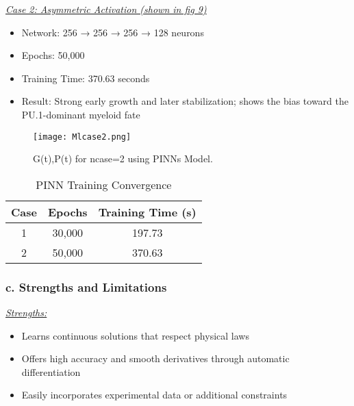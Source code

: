\documentclass[journal]{IEEEtran}
\begin{document}
\underline{\textit{Case 2: Asymmetric Activation (shown in fig 9)}}
\begin{itemize}
    \item Network: 256 → 256 → 256 → 128 neurons
    \item Epochs: 50,000
    \item Training Time: 370.63 seconds
    \item Result: Strong early growth and later stabilization; shows the bias toward the PU.1-dominant myeloid fate
\end{itemize}

\begin{figure}[H]%
\begin {center}
\texttt{[image: Mlcase2.png]}
\caption{  G(t),P(t) for  ncase=2 using PINNs Model. }
\label{fig:ecg}
\end {center}
\end{figure}

\vspace{0.5em}

\begin{table}[H]
\centering
\caption{PINN Training Convergence}
\begin{tabular}{|c|c|c|}
\hline
\textbf{Case} & \textbf{Epochs} & \textbf{Training Time (s)} \\
\hline
1 & 30,000 & 197.73 \\
2 & 50,000 & 370.63 \\
\hline
\end{tabular}
\end{table}

\vspace{1em}

\subsubsection*{\textbf{c. Strengths and Limitations}} \hfill

\underline{\textit{Strengths:}}
\begin{itemize}
    \item Learns continuous solutions that respect physical laws
    \item Offers high accuracy and smooth derivatives through automatic differentiation
    \item Easily incorporates experimental data or additional constraints
\end{itemize}

\vspace{0.5em}
\end{document}

